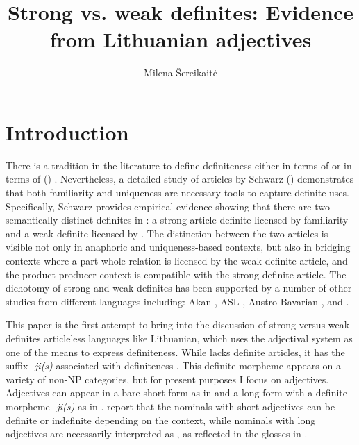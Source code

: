 \documentclass[output=paper,
modfonts
]{langscibook}
\title{Strong vs. weak definites: Evidence from Lithuanian adjectives}
\author{Milena Šereikaitė\affiliation{University of Pennsylvania}}
\begin{document}
\maketitle

\section{Introduction} 
There is a tradition in the literature to define definiteness either in terms of  \citep{Russell1905,Strawson1950,Frege1892,} or in terms of  () \citep{Christophersen1939,Kamp1981,Heim1982}. Nevertheless, a detailed study of  articles by Schwarz (\citeyear{Schwarz2009}) demonstrates that both familiarity and uniqueness are necessary tools to capture definite uses. Specifically, Schwarz provides empirical evidence showing that there are two semantically distinct definites in : a strong article definite licensed by familiarity and a weak definite licensed by . The distinction between the two articles is visible not only in anaphoric and uniqueness-based contexts, but also in bridging contexts where a part-whole relation is licensed by the weak definite article, and the product-producer context is compatible with the strong definite article. The dichotomy of strong and weak definites has been supported by a number of other studies from different languages including: Akan \citep{ArkohMatthewson2013}, ASL , Austro-Bavarian \citep{Simonenko2014}, and  \citep{Ingason2016}.

This paper is the first attempt to bring into the discussion of strong versus weak definites articleless languages like Lithuanian, which uses the adjectival system as one of the means to express definiteness. While  lacks definite articles, it has the suffix \textit{-ji(s)} associated with definiteness \citep{Ambrazas1997}. This definite morpheme appears on a variety of non-NP categories, but for present purposes I focus on adjectives. Adjectives can appear in a bare short form as in  and a long form with a definite morpheme \textit{-ji(s)} as in . \citet{GillonArmoskaite2015} report that the nominals with short adjectives can be definite or indefinite depending on the context, while nominals with long adjectives are necessarily interpreted as , as reflected in the glosses in .  
\end{document}
